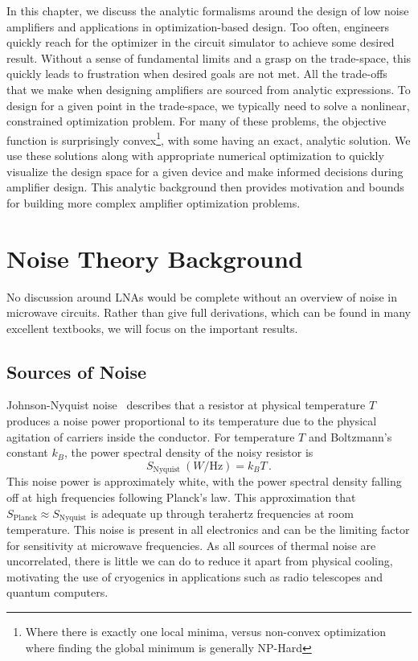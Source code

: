 In this chapter, we discuss the analytic formalisms around the design of low noise amplifiers and applications in optimization-based design.
Too often, engineers quickly reach for the optimizer in the circuit simulator to achieve some desired result.
Without a sense of fundamental limits and a grasp on the trade-space, this quickly leads to frustration when desired goals are not met.
All the trade-offs that we make when designing amplifiers are sourced from analytic expressions.
To design for a given point in the trade-space, we typically need to solve a nonlinear, constrained optimization problem.
For many of these problems, the objective function is surprisingly convex\footnote{Where there is exactly one local minima, versus non-convex optimization where finding the global minimum is generally NP-Hard}, with some having an exact, analytic solution.
We use these solutions along with appropriate numerical optimization to quickly visualize the design space for a given device and make informed decisions during amplifier design.
This analytic background then provides motivation and bounds for building more complex amplifier optimization problems.

\section{Noise Theory Background}

No discussion around LNAs would be complete without an overview of noise in microwave circuits.
Rather than give full derivations, which can be found in many excellent textbooks, we will focus on the important results.

\subsection{Sources of Noise}

Johnson-Nyquist noise~\cite{nyquistThermalAgitationElectric1928} describes that a resistor at physical temperature $T$ produces a noise power proportional to its temperature due to the physical agitation of carriers inside the conductor.
For temperature $T$ and Boltzmann's constant $k_B$, the power spectral density of the noisy resistor is
%
\begin{equation}
    S_\text{Nyquist}~(W/\text{Hz}) = k_BT \,.
    \label{eq:nyquist_noise}
\end{equation}
%
This noise power is approximately white, with the power spectral density falling off at high frequencies following Planck's law.
This approximation that $S_\text{Planck} \approx S_\text{Nyquist}$ is adequate up through terahertz frequencies at room temperature.
This noise is present in all electronics and can be the limiting factor for sensitivity at microwave frequencies.
As all sources of thermal noise are uncorrelated, there is little we can do to reduce it apart from physical cooling, motivating the use of cryogenics in applications such as radio telescopes and quantum computers.

